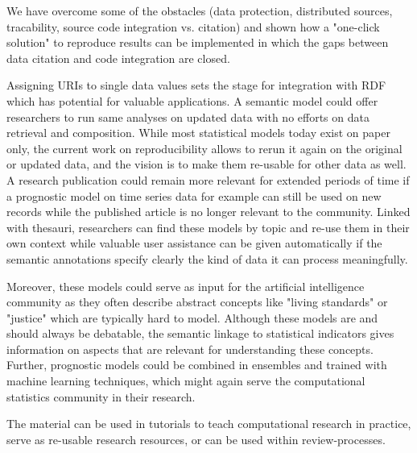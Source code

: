 \documentclass{acm_proc_article-sp}
\begin{document}

We have overcome some of the obstacles (data protection, distributed sources, tracability, source code integration vs. citation) and shown how a "one-click solution" to reproduce results can be implemented in which the gaps between data citation and code integration are closed.




Assigning URIs to single data values sets the stage for integration with RDF which has potential for valuable applications.
A semantic model could offer researchers to run same analyses on updated data with no efforts on data retrieval and composition.
While most statistical models today exist on paper only, the current work on reproducibility allows to rerun it again on the original or updated data, and the vision is to make them re-usable for other data as well.
A research publication could remain more relevant for extended periods of time if a prognostic model on time series data for example can still be used on new records while the published article is no longer relevant to the community.
Linked with thesauri, researchers can find these models by topic and re-use them in their own context while valuable user assistance can be given automatically if the semantic annotations specify clearly the kind of data it can process meaningfully.


Moreover, these models could serve as input for the artificial intelligence community as they often describe abstract concepts like "living standards" or "justice" which are typically hard to model.
Although these models are and should always be debatable, the semantic linkage to statistical indicators gives information on aspects that are relevant for understanding these concepts.
Further, prognostic models could be combined in ensembles and trained with machine learning techniques, which might again serve the computational statistics community in their research.





%
%

The material can be used in tutorials to teach computational research in practice, serve as re-usable research resources, or can be used within review-processes.

\end{document}
